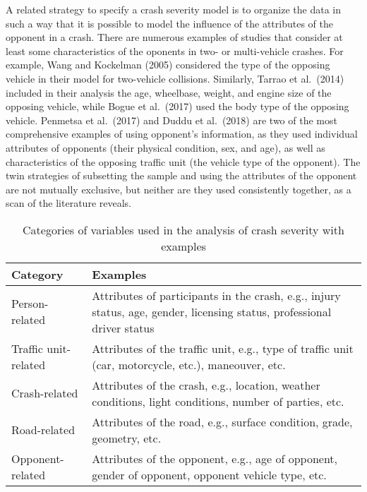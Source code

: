 \documentclass[]{elsarticle} %
\begin{document}
A related strategy to specify a crash severity model is to organize the
data in such a way that it is possible to model the influence of the
attributes of the opponent in a crash. There are numerous examples of
studies that consider at least some characteristics of the oponents in
two- or multi-vehicle crashes. For example, Wang and Kockelman (2005)
considered the type of the opposing vehicle in their model for
two-vehicle collisions. Similarly, Tarrao et al.~(2014) included in
their analysis the age, wheelbase, weight, and engine size of the
opposing vehicle, while Bogue et al.~(2017) used the body type of the
opposing vehicle. Penmetsa et al.~(2017) and Duddu et al.~(2018) are two
of the most comprehensive examples of using opponent's information, as
they used individual attributes of opponents (their physical condition,
sex, and age), as well as characteristics of the opposing traffic unit
(the vehicle type of the opponent). The twin strategies of subsetting
the sample and using the attributes of the opponent are not mutually
exclusive, but neither are they used consistently together, as a scan of
the literature reveals.

\begin{table}

\caption{\label{tab:table-variable-categories}\label{tab:variable-categories}Categories of variables used in the analysis of crash severity with examples}
\centering
\fontsize{7}{9}\selectfont
\begin{tabular}[t]{l>{\raggedright\arraybackslash}p{22em}}
\toprule
Category & Examples\\
\midrule
Person-related & Attributes of participants in the crash, e.g., injury status, age, gender, licensing status, professional driver status\\
Traffic unit-related & Attributes of the traffic unit, e.g., type of traffic unit (car, motorcycle, etc.), maneouver, etc.\\
Crash-related & Attributes of the crash, e.g., location, weather conditions, light conditions, number of parties, etc.\\
Road-related & Attributes of the road, e.g., surface condition, grade, geometry, etc.\\
Opponent-related & Attributes of the opponent, e.g., age of opponent, gender of opponent, opponent vehicle type, etc.\\
\bottomrule
\end{tabular}
\end{table}
\end{document}
